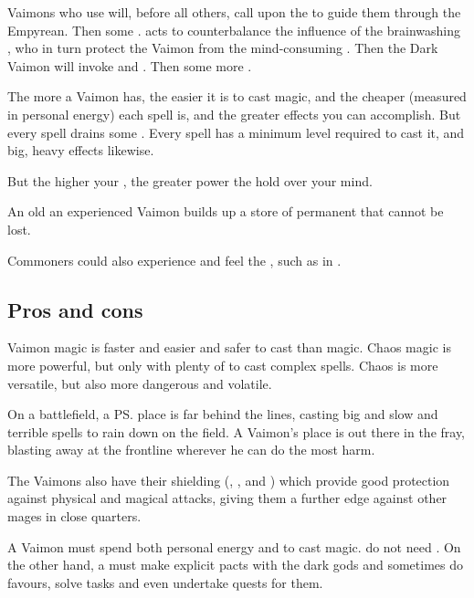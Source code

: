 Vaimons who use \Itzach{} will, before all others, call upon the \qliphah{}  to guide them through the Empyrean. 
Then some \sephiroth. 
\KorRashad{} acts to counterbalance the influence of the brainwashing \sephiroth{}, who in turn protect the Vaimon from the mind-consuming \qliphoth. 
Then the Dark Vaimon will invoke  and . 
Then some more \Archons. 

The more \shechinah{} a Vaimon has, the easier it is to cast magic, and the cheaper (measured in personal energy) each spell is, and the greater effects you can accomplish. 
But every spell drains some \shechinah. 
Every spell has a minimum \shechinah{} level required to cast it, and big, heavy effects likewise. 

But the higher your \shechinah{}, the greater power the \Archons{} hold over your mind. 

An old an experienced Vaimon builds up a store of permanent \shechinah{} that cannot be lost. 

Commoners could also experience and feel the \shechinah, such as in . 









\subsection{Pros and cons}
Vaimon magic is faster and easier and safer to cast than \rethyactic{} magic. 
Chaos magic is more powerful, but only with plenty of  to cast complex spells. 
Chaos is more versatile, but also more dangerous and volatile. 

On a battlefield, a \rethyactic{} \ps{\ishrah} place is far behind the lines, casting big and slow and terrible spells to rain down on the field. 
A Vaimon's place is out there in the fray, blasting away at the frontline wherever he can do the most harm. 

The Vaimons also have their shielding \sephiroth{} (\Barion, \Hoshied, \Teshiron{} and \Yeziel) which provide good protection against physical and magical attacks, giving them a further edge against other mages in close quarters. 

A Vaimon must spend both personal energy and \shechinah{} to cast magic. 
\Rethyaxes{} do not need \shechinah. 
On the other hand, a \rethyax{} must make explicit pacts with the dark gods and sometimes do favours, solve tasks and even undertake quests for them. 









